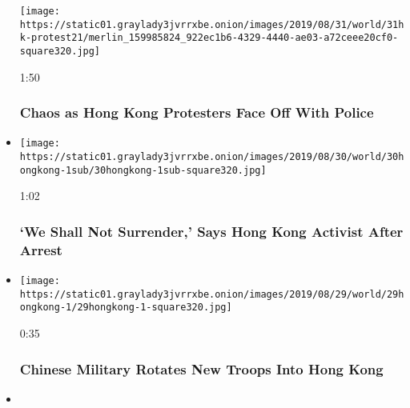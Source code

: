 \begin{itemize}
  \texttt{[image: https://static01.graylady3jvrrxbe.onion/images/2019/08/31/world/31hk-protest21/merlin\_159985824\_922ec1b6-4329-4440-ae03-a72ceee20cf0-square320.jpg]}

  1:50

  \hypertarget{chaos-as-hong-kong-protesters-face-off-with-police}{%
  \subsubsection{Chaos as Hong Kong Protesters Face Off With
  Police}\label{chaos-as-hong-kong-protesters-face-off-with-police}}
\item
  \href{https://www.nytimes3xbfgragh.onion/video/world/asia/100000006689840/hong-kong-activists.html?action=click\&module=video-series-bar\&region=header\&pgtype=Article\&playlistId=video/hk-protest}{}

  \texttt{[image: https://static01.graylady3jvrrxbe.onion/images/2019/08/30/world/30hongkong-1sub/30hongkong-1sub-square320.jpg]}

  1:02

  \hypertarget{we-shall-not-surrender-says-hong-kong-activist-after-arrest}{%
  \subsubsection{`We Shall Not Surrender,' Says Hong Kong Activist After
  Arrest}\label{we-shall-not-surrender-says-hong-kong-activist-after-arrest}}
\item
  \href{https://www.nytimes3xbfgragh.onion/video/world/asia/100000006687546/china-military-hong-kong.html?action=click\&module=video-series-bar\&region=header\&pgtype=Article\&playlistId=video/hk-protest}{}

  \texttt{[image: https://static01.graylady3jvrrxbe.onion/images/2019/08/29/world/29hongkong-1/29hongkong-1-square320.jpg]}

  0:35

  \hypertarget{chinese-military-rotates-new-troops-into-hong-kong}{%
  \subsubsection{Chinese Military Rotates New Troops Into Hong
  Kong}\label{chinese-military-rotates-new-troops-into-hong-kong}}
\item
  \href{https://www.nytimes3xbfgragh.onion/video/world/asia/100000006679951/hong-kong-protests.html?action=click\&module=video-series-bar\&region=header\&pgtype=Article\&playlistId=video/hk-protest}{}


\end{itemize}
